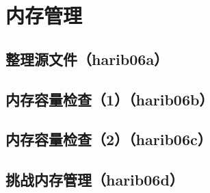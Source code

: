 ﻿\chapter{	内存管理	}
\section{	整理源文件（harib06a）	}
\section{	内存容量检查（1）（harib06b）	}
\section{	内存容量检查（2）（harib06c）	}
\section{	挑战内存管理（harib06d）	}

